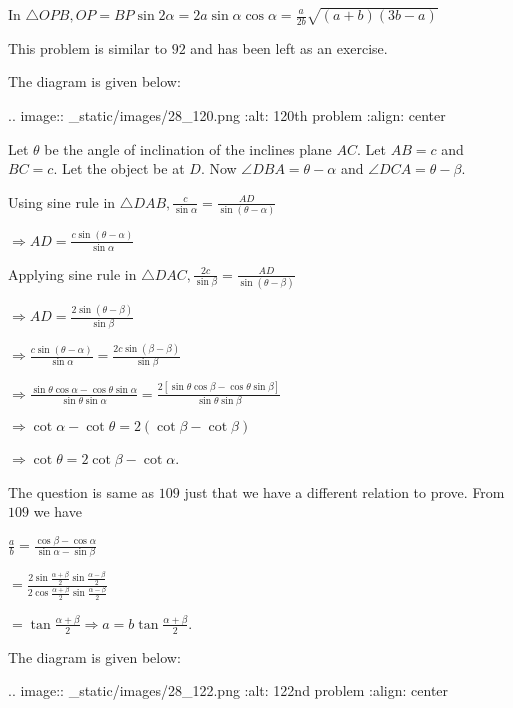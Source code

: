   In $\triangle OPB, OP = BP\sin2\alpha = 2a\sin\alpha\cos\alpha = \frac{a}{2b}\sqrt{(a + b)(3b - a)}$

\item This problem is similar to $92$ and has been left as an exercise.

\item The diagram is given below:

  .. image:: _static/images/28_120.png
  :alt: 120th problem
  :align: center

  Let $\theta$ be the angle of inclination of the inclines plane $AC$. Let $AB = c$ and
  $BC = c$. Let the object be at $D$. Now $\angle DBA = \theta - \alpha$ and
  $\angle DCA = \theta - \beta$.

  Using sine rule in $\triangle DAB, \frac{c}{\sin\alpha} = \frac{AD}{\sin(\theta - \alpha)}$

  $\Rightarrow AD = \frac{c\sin(\theta - \alpha)}{\sin\alpha}$

  Applying sine rule in $\triangle DAC, \frac{2c}{\sin\beta} = \frac{AD}{\sin(\theta - \beta)}$

  $\Rightarrow AD = \frac{2\sin(\theta - \beta)}{\sin\beta}$

  $\Rightarrow \frac{c\sin(\theta - \alpha)}{\sin\alpha} = \frac{2c\sin(\beta - \beta)}{\sin\beta}$

  $\Rightarrow \frac{\sin\theta\cos\alpha - \cos\theta\sin\alpha}{\sin\theta\sin\alpha} =
  \frac{2[\sin\theta\cos\beta - \cos\theta\sin\beta]}{\sin\theta\sin\beta}$

  $\Rightarrow \cot\alpha - \cot\theta = 2(\cot\beta - \cot\beta)$

  $\Rightarrow \cot\theta = 2\cot\beta - \cot\alpha$.

\item The question is same as $109$ just that we have a different relation to prove. From $109$
  we have

  $\frac{a}{b} = \frac{\cos\beta - \cos\alpha}{\sin\alpha - \sin\beta}$

  $= \frac{2\sin\frac{\alpha + \beta}{2}\sin\frac{\alpha - \beta}{2}}{2\cos\frac{\alpha +
      \beta}{2}\sin\frac{\alpha - \beta}{2}}$

  $= \tan\frac{\alpha + \beta}{2}\Rightarrow a = b\tan\frac{\alpha + \beta}{2}$.

\item The diagram is given below:

  .. image:: _static/images/28_122.png
  :alt: 122nd problem
  :align: center

